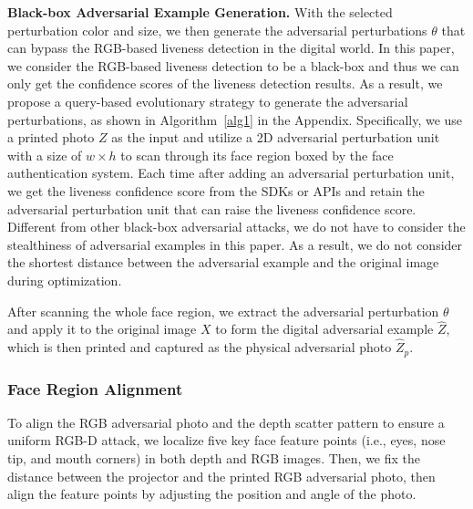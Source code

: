 \textbf{Black-box Adversarial Example Generation.}
With the selected perturbation color and size, we then generate the adversarial perturbations $\theta$ that can bypass the RGB-based liveness detection in the digital world.
In this paper, we consider the RGB-based liveness detection to be a black-box and thus we can only get the confidence scores of the liveness detection results. As a result, we propose a query-based evolutionary strategy to generate the adversarial perturbations, as shown in Algorithm~\ref{alg1} in the Appendix.
Specifically, we use a printed photo $Z$ as the input and utilize a 2D adversarial perturbation unit with a size of $w\times h$  to scan through its face region boxed by the face authentication system. Each time after adding an adversarial perturbation unit, we get the liveness confidence score from the SDKs or APIs and retain the adversarial perturbation unit that can raise the liveness confidence score. 
Different from other black-box adversarial attacks, we do not have to consider the stealthiness of adversarial examples in this paper. As a result, we do not consider the shortest distance between the adversarial example and the original image during optimization. 

After scanning the whole face region, we extract the adversarial perturbation $\theta$ and apply it to the original image $X$ to form the digital adversarial example $\widehat{Z}$,  which is then printed and captured as the physical adversarial photo $\widehat{Z}_p$. 


\subsubsection{Face Region Alignment}
To align the RGB adversarial photo and the depth scatter pattern to ensure a uniform RGB-D attack, we localize five key face feature points (i.e., eyes, nose tip, and mouth corners) in both depth and RGB images. Then, we fix the distance between the projector and the printed RGB adversarial photo, then align the feature points by adjusting the position and angle of the photo.



